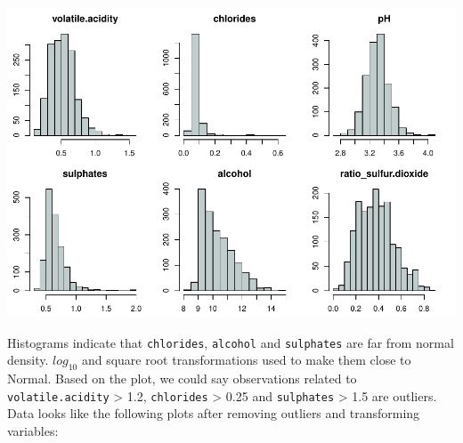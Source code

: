 \documentclass[../main.tex]{subfiles}
\begin{document}
\includegraphics{AppendixFiles/Hist1-1.pdf}


\noindent Histograms indicate that \texttt{chlorides}, \texttt{alcohol} and \texttt{sulphates} are far from normal density. $log_{10}$ and square root transformations used to make them close to Normal. Based on the plot, we could say observations related to \texttt{volatile.acidity} > 1.2, \texttt{chlorides} > 0.25 and \texttt{sulphates} > 1.5 are outliers. Data looks like the following plots after removing outliers and transforming variables:
\end{document}
